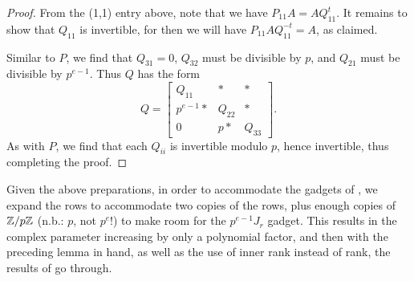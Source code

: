 \begin{proof}
	From the (1,1) entry above, note that we have $P_{11} A = A Q_{11}^t$. It remains to show that $Q_{11}$ is invertible, for then we will have $P_{11} A Q_{11}^{-t} = A$, as claimed.
	
	Similar to $P$, we find that $Q_{31} = 0$, $Q_{32}$ must be divisible by $p$, and $Q_{21}$ must be divisible by $p^{e-1}$. Thus $Q$ has the form
	\[
	Q = \begin{bmatrix}
		Q_{11} & * & * \\
		p^{e-1}* & Q_{22} & * \\
		0 & p* & Q_{33}
	\end{bmatrix}.
	\]
	As with $P$, we find that each $Q_{ii}$ is invertible modulo $p$, hence invertible, thus completing the proof.
\end{proof}

\begin{remark}\label{rem:TI4}
	Given the above preparations, in order to accommodate the gadgets of \cite{TI4}, we expand the rows to accommodate two copies of the rows, plus enough copies of $\mathbb{Z} / p \mathbb{Z}$ (n.b.: $p$, not $p^e$!) to make room for the $p^{e-1} J_r$ gadget. This results in the complex parameter increasing by only a polynomial factor, and then with the preceding lemma in hand, as well as the use of inner rank instead of rank, the results of \cite{TI4} go through. 
\end{remark}
%
%
